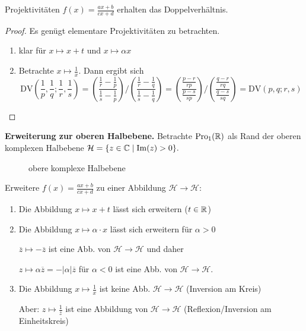   \begin{thm}
    Projektivitäten $\displaystyle{f(x)=\frac{ax+b}{cx+d}}$ erhalten das Doppelverhältnis.
  \end{thm}
  \begin{proof}
    Es genügt elementare Projektivitäten zu betrachten.\par
    \begin{enumerate}[(1)]
      \item klar für $x\mapsto x+t$ und $x\mapsto \alpha x$
      \item Betrachte $x\mapsto \frac{1}{x}$. Dann ergibt sich
            \begin{equation*}
                \text{DV}\left( \frac{1}{p}, \frac{1}{q}; \frac{1}{r}, \frac{1}{s} \right)
                  = \left( \frac{ \frac{1}{r}-\frac{1}{p} }{ \frac{1}{s}-\frac{1}{p} }\right)\Big/\left(\frac{ \frac{1}{r}-\frac{1}{q} }{ \frac{1}{s}-\frac{1}{q}}\right)
                  = \left( \frac{ \frac{p-r}{rp} }{ \frac{p-s}{sp} } \right) \Big/ \left( \frac{ \frac{q-r}{rq} }{ \frac{q-s}{sq} } \right)
                  = \text{DV}(p,q;r,s)
            \end{equation*}
    \end{enumerate}
  \end{proof}


  \textbf{Erweiterung zur oberen Halbebene.} Betrachte $\operatorname{Pro}_1(\mathbb R)$ als Rand der oberen komplexen Halbebene
  $\mathcal{H}=\lbrace z\in \mathbb C \mid \operatorname{Im}(z) >0 \rbrace.$
  \begin{figure}[ht]
    
    \caption{obere komplexe Halbebene}
  \end{figure}
  Erweitere $\displaystyle{f(x)=\frac{ax+b}{cx+d}}$ zu einer Abbildung $\mathcal{H}\to \mathcal{H}$:
  \begin{enumerate}[(1)]
    \item Die Abbildung $x\mapsto x+t$ lässt sich erweitern ($t\in \mathbb R$)
    \item Die Abbildung $x\mapsto \alpha \cdot x$ lässt sich erweitern für $\alpha > 0$ \par
          $\overline{z} \mapsto -\overline{z}$ ist eine Abb. von $\mathcal{H} \to \mathcal{H}$ und daher \par
          $ z\mapsto \alpha \overline{z}=-\lvert \alpha \rvert \overline{z}$ für $\alpha < 0$ ist eine Abb.
          von $\mathcal{H}\to \mathcal{H}$.
    \item Die Abbildung $x \mapsto \frac{1}{x}$ ist keine Abb. $\mathcal{H}\to \mathcal{H}$ (Inversion am Kreis) \par
          Aber: $z\mapsto \frac{1}{\overline{z}}$ ist eine Abbildung von $\mathcal{H}\to \mathcal{H}$ (Reflexion/Inversion am Einheitskreis)

  \end{enumerate}

